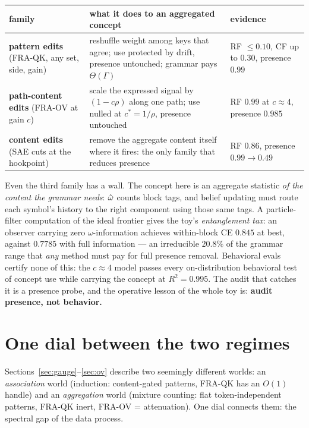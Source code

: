 \documentclass{article}
\begin{document}
\begin{center}
\begin{tabular}{p{}p{}p{}}
\toprule
family & what it does to an aggregated concept & evidence \\
\midrule
\textbf{pattern edits} (FRA-QK, any set, side, gain) & reshuffle weight among keys that agree; use protected by drift, presence untouched; grammar pays $\Theta(\Gamma)$ & RF $\le 0.10$, CF up to $0.30$, presence $0.99$ \\
\textbf{path-content edits} (FRA-OV at gain $c$) & scale the expressed signal by $(1 - c\rho)$ along one path; use nulled at $c^* = 1/\rho$, presence untouched & RF $0.99$ at $c \approx 4$, presence $0.985$ \\
\textbf{content edits} (SAE cuts at the hookpoint) & remove the aggregate content itself where it fires: the only family that reduces presence & RF $0.86$, presence $0.99 \to 0.49$ \\
\bottomrule
\end{tabular}
\end{center}

Even the third family has a wall. The concept here is an aggregate statistic \emph{of the content the grammar needs}: $\hat{\omega}$ counts block tags, and belief updating must route each symbol's history to the right component using those same tags. A particle-filter computation of the ideal frontier gives the toy's \emph{entanglement tax}: an observer carrying zero $\omega$-information achieves within-block CE $0.845$ at best, against $0.7785$ with full information --- an irreducible $20.8\%$ of the grammar range that \emph{any} method must pay for full presence removal. Behavioral evals certify none of this: the $c \approx 4$ model passes every on-distribution behavioral test of concept use while carrying the concept at $R^2 = 0.995$. The audit that catches it is a presence probe, and the operative lesson of the whole toy is: \textbf{audit presence, not behavior.}

\section{One dial between the two regimes}\label{sec:dial}

Sections~\ref{sec:gauge}--\ref{sec:ov} describe two seemingly different worlds: an \emph{association} world (induction: content-gated patterns, FRA-QK has an $O(1)$ handle) and an \emph{aggregation} world (mixture counting: flat token-independent patterns, FRA-QK inert, FRA-OV = attenuation). One dial connects them: the spectral gap of the data process.
\end{document}
